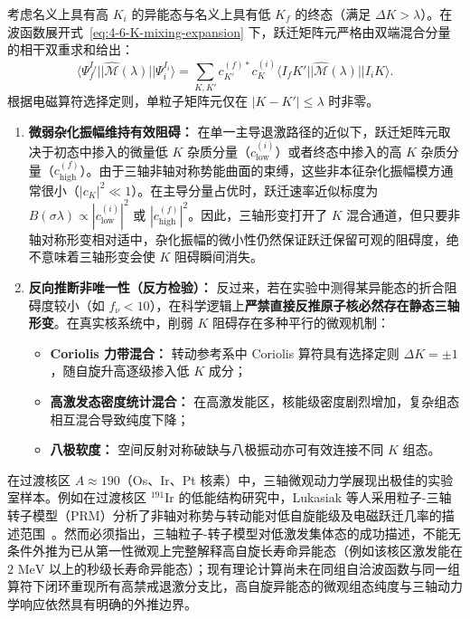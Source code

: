 考虑名义上具有高 $K_i$ 的异能态与名义上具有低 $K_f$ 的终态（满足 $\Delta K > \lambda$）。在波函数展开式~\eqref{eq:4-6-K-mixing-expansion} 下，跃迁矩阵元严格由双端混合分量的相干双重求和给出：
\begin{equation}\label{eq:4-6-K-mixed-matrix-element}
\langle \Psi_f^{I_f} || \hat{\mathcal{M}}(\lambda) || \Psi_i^{I_i} \rangle = \sum_{K, K'} c_{K'}^{(f)*} c_K^{(i)} \langle I_f K' || \hat{\mathcal{M}}(\lambda) || I_i K \rangle.
\end{equation}
根据电磁算符选择定则，单粒子矩阵元仅在 $|K - K'| \le \lambda$ 时非零。
\begin{enumerate}
\item \textbf{微弱杂化振幅维持有效阻碍：}
在单一主导退激路径的近似下，跃迁矩阵元取决于初态中掺入的微量低 $K$ 杂质分量（$c_{\mathrm{low}}^{(i)}$）或者终态中掺入的高 $K$ 杂质分量（$c_{\mathrm{high}}^{(f)}$）。由于三轴非轴对称势能曲面的束缚，这些非本征杂化振幅模方通常很小（$|c_K|^2 \ll 1$）。在主导分量占优时，跃迁速率近似标度为 $B(\sigma\lambda) \propto |c_{\mathrm{low}}^{(i)}|^2$ 或 $|c_{\mathrm{high}}^{(f)}|^2$。因此，三轴形变打开了 $K$ 混合通道，但只要非轴对称形变相对适中，杂化振幅的微小性仍然保证跃迁保留可观的阻碍度，绝不意味着三轴形变会使 $K$ 阻碍瞬间消失。
\item \textbf{反向推断非唯一性（反方检验）：}
反过来，若在实验中测得某异能态的折合阻碍度较小（如 $f_\nu < 10$），在科学逻辑上\textbf{严禁直接反推原子核必然存在静态三轴形变}。在真实核系统中，削弱 $K$ 阻碍存在多种平行的微观机制：
\begin{itemize}
\item \textbf{Coriolis 力带混合：} 转动参考系中 Coriolis 算符具有选择定则 $\Delta K = \pm 1$，随自旋升高逐级掺入低 $K$ 成分；
\item \textbf{高激发态密度统计混合：} 在高激发能区，核能级密度剧烈增加，复杂组态相互混合导致纯度下降；
\item \textbf{八极软度：} 空间反射对称破缺与八极振动亦可有效连接不同 $K$ 组态。
\end{itemize}
\end{enumerate}

在过渡核区 $A\approx 190$（Os、Ir、Pt 核素）中，三轴微观动力学展现出极佳的实验室样本。例如在过渡核区 $^{191}\mathrm{Ir}$ 的低能结构研究中，Lukasiak 等人采用粒子-三轴转子模型（PRM）分析了非轴对称势与转动能对低自旋能级及电磁跃迁几率的描述范围~\cite{continuation-g18-lukasiak-1979-191ir-triaxial-rotor}。然而必须指出，三轴粒子-转子模型对低激发集体态的成功描述，不能无条件外推为已从第一性微观上完整解释高自旋长寿命异能态（例如该核区激发能在 $2\text{ MeV}$ 以上的秒级长寿命异能态）；现有理论计算尚未在同组自洽波函数与同一组算符下闭环重现所有高禁戒退激分支比，高自旋异能态的微观组态纯度与三轴动力学响应依然具有明确的外推边界。

